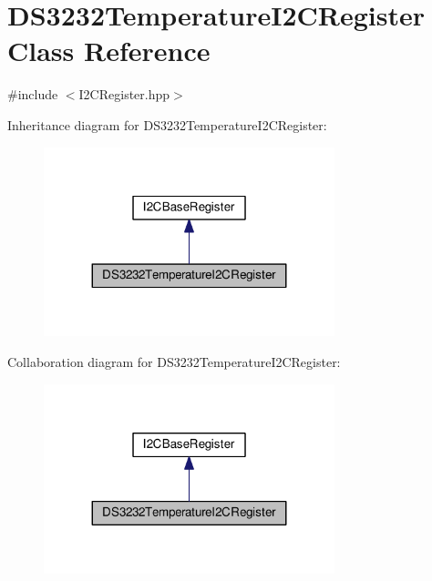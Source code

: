 \hypertarget{class_d_s3232_temperature_i2_c_register}{}\section{D\+S3232\+Temperature\+I2\+C\+Register Class Reference}
\label{class_d_s3232_temperature_i2_c_register}


{\ttfamily \#include $<$I2\+C\+Register.\+hpp$>$}



Inheritance diagram for D\+S3232\+Temperature\+I2\+C\+Register\+:\nopagebreak
\begin{figure}[H]
\begin{center}
\leavevmode
\includegraphics[width=239pt]{class_d_s3232_temperature_i2_c_register__inherit__graph}
\end{center}
\end{figure}


Collaboration diagram for D\+S3232\+Temperature\+I2\+C\+Register\+:\nopagebreak
\begin{figure}[H]
\begin{center}
\leavevmode
\includegraphics[width=239pt]{class_d_s3232_temperature_i2_c_register__coll__graph}
\end{center}
\end{figure}
